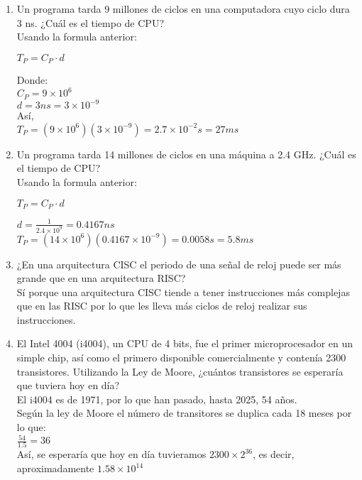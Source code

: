 \documentclass[a4paper,12pt]{article}
\begin{document}
\begin{enumerate}[label=\textcolor{teal}{\textbf{\arabic*.}}]
    \item Un programa tarda 9 millones de ciclos en una computadora cuyo ciclo dura 3 ns. ¿Cuál es el tiempo de CPU?\\
    Usando la formula anterior:
    \begin{center}
        $T_P = {C_P} \cdot {d}$
    \end{center}
    Donde:\\
    ${C_P}=9 \times 10^{6}$\\
    $d=3ns = 3 \times 10^{-9}$\\
    Así,\\
    $T_P = (9 \times 10^{6})(3 \times 10^{-9})= 2.7\times10^{-2}s=27ms$

    \item Un programa tarda 14 millones de ciclos en una máquina a 2.4 GHz. ¿Cuál es el tiempo de CPU?\\
    Usando la formula anterior:
    \begin{center}
        $T_P = {C_P} \cdot {d}$
    \end{center}
    $d = \frac{1}{2.4\times 10^{9}} = 0.4167ns$\\
    $T_P = (14 \times 10^{6})(0.4167 \times 10^{-9})= 0.0058s=5.8ms$
    \item ¿En una arquitectura CISC el periodo de una señal de reloj puede ser más grande que en una  arquitectura RISC?\\
    Sí porque una arquitectura CISC tiende a tener instrucciones más complejas que en las RISC por lo que les lleva más ciclos de reloj realizar sus instrucciones.

    \item El Intel 4004 (i4004), un CPU de 4 bits, fue el primer microprocesador en un simple chip, así como el primero disponible comercialmente y contenía 2300 transistores. Utilizando la Ley de Moore, ¿cuántos transistores se esperaría que tuviera hoy en día?  \\
    El i4004 es de 1971, por lo que han pasado, hasta 2025, 54 años.\\
    Según la ley de Moore el número de transitores se duplica cada 18 meses por lo que:\\
    $\frac{54}{1.5}=36$\\
    Así, se esperaría que hoy en día tuvieramos $2300\times2^{36}$, es decir, aproximadamente $1.58\times 10^{14}$


\end{enumerate}
\end{document}
